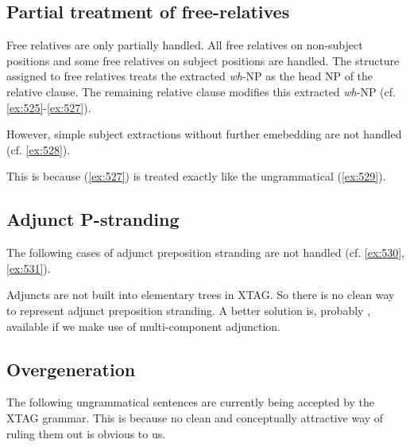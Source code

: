\subsection{Partial treatment of free-relatives} 
Free relatives are only partially handled. All free relatives on non-subject 
positions and some free relatives on subject positions 
are handled. The structure assigned 
to free relatives treats the extracted {\em wh}-NP as the head NP of 
the relative clause. The remaining relative clause modifies this 
extracted {\em wh}-NP (cf. \ref{ex:525}-\ref{ex:527}). 
 
\beginsentences
{}\label{ex:525} 
\label{ex:526} 
\label{ex:527} 
\endsentences

 
However, simple subject extractions without further emebedding are not 
handled (cf. \ref{ex:528}). 
 
\beginsentences
{}\label{ex:528} 
\endsentences

This is because (\ref{ex:527}) is treated exactly like the ungrammatical (\ref{ex:529}). 
\beginsentences
{}\label{ex:529} 
\endsentences

 
 
\subsection{Adjunct P-stranding} 
The following cases of adjunct preposition stranding are not handled 
(cf. \ref{ex:530}, \ref{ex:531}). 
 
\beginsentences
{}\label{ex:530} 
\label{ex:531} 
\endsentences

 
Adjuncts are not built into elementary trees in XTAG. So there is no 
clean way to represent adjunct preposition stranding. A better 
solution is, probably , available if we make use of multi-component 
adjunction. 
 
\subsection{Overgeneration} 
The following ungrammatical sentences are currently being 
accepted by the XTAG grammar. This is because no clean 
and conceptually attractive way of ruling them out 
is obvious to us. 
 
